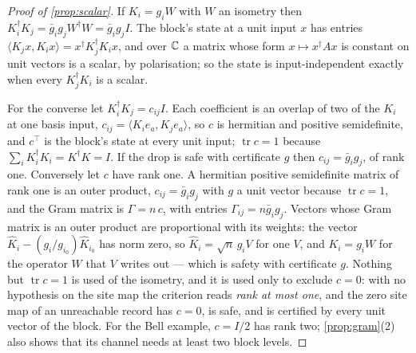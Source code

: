 \documentclass[acmsmall,screen,review,anonymous,nonacm]{acmart}
\begin{document}
\begin{proof}[Proof of \cref{prop:scalar}]
If $K_i = g_i W$ with $W$ an isometry then $K_i^{\dagger}K_j = \bar g_i g_j
W^{\dagger}W = \bar g_i g_j I$. The block's state at a unit input $x$ has
entries $\langle K_j x, K_i x\rangle = x^{\dagger} K_j^{\dagger} K_i x$, and
over $\mathbb{C}$ a matrix whose form $x \mapsto x^{\dagger}Ax$ is constant on unit
vectors is a scalar, by polarisation; so the state is input-independent
exactly when every $K_j^{\dagger}K_i$ is a scalar.

For the converse let $K_i^{\dagger}K_j = c_{ij}I$. Each coefficient is an overlap of
two of the $K_i$ at one basis input, $c_{ij} = \langle K_ie_a, K_je_a\rangle$, so $c$ is hermitian
and positive semidefinite, and $c^{\top}$ is the block's state at every unit input;
$\operatorname{tr}c = 1$ because $\sum_iK_i^{\dagger}K_i = K^{\dagger}K = I$.
If the drop is safe with certificate $g$ then $c_{ij} = \bar g_ig_j$, of rank one.
Conversely let $c$ have rank one. A hermitian positive semidefinite matrix of rank one is
an outer product, $c_{ij} = \bar g_ig_j$ with $g$ a unit vector because
$\operatorname{tr}c = 1$, and the Gram matrix is $\Gamma = n\,c$, with entries $\Gamma_{ij}=n\bar g_i g_j$.
Vectors whose Gram matrix is an outer product are proportional with its weights: the
vector $\hat K_i - (g_i/g_{i_0})\hat K_{i_0}$ has norm zero, so $\hat K_i = \sqrt n\,g_iV$
for one $V$, and $K_i = g_iW$ for the operator $W$ that $V$ writes out --- which is safety
with certificate $g$.
Nothing but $\operatorname{tr}c = 1$ is used of the isometry, and it is used only to
exclude $c = 0$: with no hypothesis on the site map the criterion reads \emph{rank at most
one}, and the zero site map of an unreachable record has $c = 0$, is safe, and is
certified by every unit vector of the block.
For the Bell example, $c=I/2$ has rank two; \cref{prop:gram}(2) also
shows that its channel needs at least two block levels.
\end{proof}

\stmtProductwise
\end{document}
